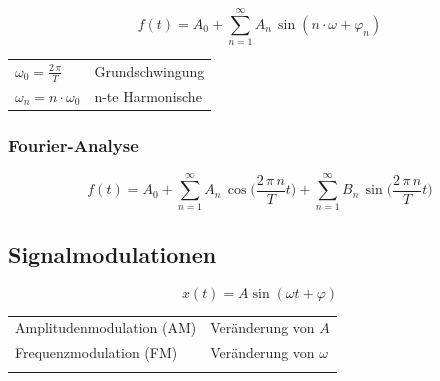 $$ \boxed{ f(t) = A_0 + \sum\limits_{n=1}^{\infty}  A_n \, \sin(n \cdot \omega + \varphi_n)  } $$

\begin{tabular}{ll}
$\omega_0 = \frac{2 \, \pi}{T}$ & Grundschwingung \\
$\omega_n = n \cdot \omega_0$ & n-te Harmonische \\
\end{tabular}



\subsubsection{Fourier-Analyse}

$$ \boxed{ f(t) = A_0 +  \sum\limits_{n=1}^{\infty}  A_n \, \cos  \Big(\frac{ 2 \, \pi \, n}{T} t \Big) + \sum\limits_{n=1}^{\infty}  B_n \, \sin \Big(\frac{ 2 \, \pi \, n}{T} t \Big)  } $$

\begin{minipage}{0.6\linewidth}
\end{minipage}
\hfill
\begin{minipage}{0.33\linewidth}
\end{minipage}


\begin{minipage}{0.6\linewidth}
\end{minipage}
\hfill
\begin{minipage}{0.33\linewidth}

\end{minipage}





\subsection{Signalmodulationen}

$$ \boxed{ x(t) = A \sin ( \omega t + \varphi)} $$ 

\begin{tabular}{ll}
Amplitudenmodulation (AM) & Veränderung von $ A $ \\
Frequenzmodulation (FM) & Veränderung von $ \omega $ \\
\\
\end{tabular}

